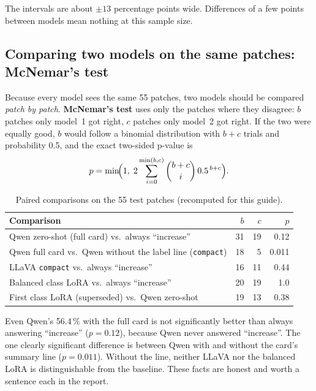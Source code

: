 The intervals are about $\pm13$ percentage points wide. Differences of a few points between models mean nothing at this sample size.

\subsection{Comparing two models on the same patches: McNemar's test}

Because every model sees the same 55 patches, two models should be compared \emph{patch by patch}. \textbf{McNemar's test} \citep{mcnemar1947} uses only the patches where they disagree: $b$ patches only model~1 got right, $c$ patches only model~2 got right. If the two were equally good, $b$ would follow a binomial distribution with $b+c$ trials and probability 0.5, and the exact two-sided p-value is
\begin{equation}
p = \min\!\Bigl(1,\; 2\sum_{i=0}^{\min(b,c)}\binom{b+c}{i}\,0.5^{\,b+c}\Bigr).
\label{eq:mcnemar}
\end{equation}

\begin{table}[H]
\centering
\caption{Paired comparisons on the 55 test patches (recomputed for this guide).}
\label{tab:mcnemar}
\begin{tabular}{lrrr}
\toprule
Comparison & $b$ & $c$ & $p$ \\
\midrule
Qwen zero-shot (full card) vs.\ always ``increase'' & 31 & 19 & 0.12 \\
Qwen full card vs.\ Qwen without the label line (\texttt{compact}) & 18 & 5 & 0.011 \\
LLaVA \texttt{compact} vs.\ always ``increase'' & 16 & 11 & 0.44 \\
Balanced class LoRA vs.\ always ``increase'' & 20 & 19 & 1.0 \\
First class LoRA (superseded) vs.\ Qwen zero-shot & 19 & 13 & 0.38 \\
\bottomrule
\end{tabular}
\end{table}

\begin{plainwords}
Even Qwen's 56.4\,\% with the full card is not significantly better than always answering ``increase'' ($p = 0.12$), because Qwen never answered ``increase''. The one clearly significant difference is between Qwen with and without the card's summary line ($p = 0.011$). Without the line, neither LLaVA nor the balanced LoRA is distinguishable from the baseline. These facts are honest and worth a sentence each in the report.
\end{plainwords}

